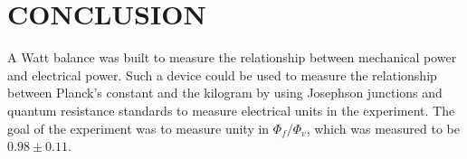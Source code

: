 \documentclass[aps,prstab,reprint,12pt]{revtex4-1}
\begin{document}

\section{CONCLUSION}

A Watt balance was built to measure the relationship between mechanical power and electrical power. Such a device could be used to measure the relationship between Planck's constant and the kilogram by using Josephson junctions and quantum resistance standards to measure electrical units in the experiment. The goal of the experiment was to measure unity in $\Phi_f/\Phi_v$, which was measured to be $0.98 \pm 0.11$.


 



\appendix
\newpage
\end{document}
